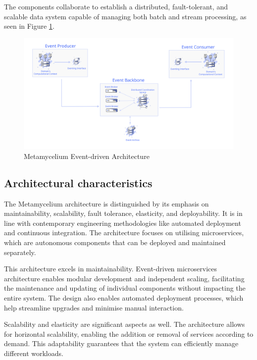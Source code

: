 \documentclass[journal]{IEEEtran}
\begin{document}
The components collaborate to establish a distributed, fault-tolerant, and scalable data system capable of managing both batch and stream processing, as seen in Figure \ref{fig:eventDrivenArchitecture}. 

\begin{figure}[h]
  \centering
  \includegraphics[width=\linewidth]{images/Event-architecture.png}
  \caption{Metamycelium Event-driven Architecture}
  \label{fig:eventDrivenArchitecture}
\end{figure}


\subsection{Architectural characteristics}

The Metamycelium architecture is distinguished by its emphasis on maintainability, scalability, fault tolerance, elasticity, and deployability. It is in line with contemporary engineering methodologies like automated deployment and continuous integration. The architecture focuses on utilising microservices, which are autonomous components that can be deployed and maintained separately.

This architecture excels in maintainability. Event-driven microservices architecture enables modular development and independent scaling, facilitating the maintenance and updating of individual components without impacting the entire system. The design also enables automated deployment processes, which help streamline upgrades and minimise manual interaction.

Scalability and elasticity are significant aspects as well. The architecture allows for horizontal scalability, enabling the addition or removal of services according to demand. This adaptability guarantees that the system can efficiently manage different workloads.
\end{document}
